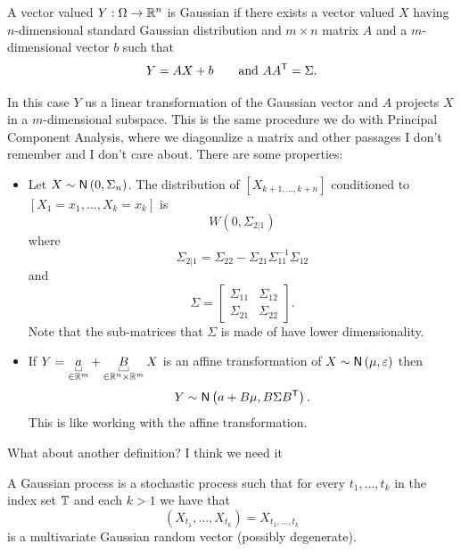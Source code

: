 \documentclass[12pt]{report}
\begin{document}
\begin{definition}
	A vector valued \rv{} $Y:\Omega\to\mathbb{R}^{n}$ is Gaussian if there exists a vector valued $X$ having $n$-dimensional standard Gaussian distribution and $m\times n$ matrix $A$ and a $m$-dimensional vector $b$ such that
	\begin{equation*}
		Y=AX+b\qquad\text{and }AA^{\mathsf{T}}=\Sigma.
	\end{equation*}
\end{definition}
In this case $Y$ us a linear transformation of the Gaussian vector and $A$ projects $X$ in a $m$-dimensional subspace. This is the same procedure we do with Principal Component Analysis, where we diagonalize a matrix and other passages I don't remember and I don't care about.
There are some properties:
\begin{proposition}
	\begin{itemize}
		\item Let $X\sim\mathsf{N}\left(0,\Sigma_{n}\right)$. The distribution of $\left[X_{k+1,\ldots,k+n}\right]$ conditioned to $\left[X_{1}=x_{1},\ldots,X_{k}=x_{k}\right]$ is \begin{equation*}
		W(0,\Sigma_{2|1})
		\end{equation*}
		where 
		\begin{equation*}
			\Sigma_{2|1}=\Sigma_{22}-\Sigma_{21}\Sigma_{11}^{-1}\Sigma_{12}
		\end{equation*}
		and 
		\begin{equation*}
			\Sigma=\begin{bmatrix}
				\Sigma_{11}&\Sigma_{12}\\
				\Sigma_{21}&\Sigma_{22}
			\end{bmatrix}.
		\end{equation*}
		Note that the sub-matrices that $\Sigma$ is made of have lower dimensionality.
		\item If $Y=\ubracketthin{a}_{\in\R^{m}}+\ubracketthin{B}_{\in\R^{n}\times\R^{m}}X$ is an affine transformation of $X\sim\mathsf{N}\left(\mu,\varepsilon\right)$ then $$Y\sim\mathsf{N}\left(a+B\mu, B\Sigma B^{\mathsf{T}}\right).$$
		This is like working with the affine transformation.
	\end{itemize}
\end{proposition}
What about another definition? I think we need it
\begin{definition}
	A Gaussian process is a stochastic process such that for every $t_{1},\ldots,t_{k}$ in the index set $\mathbb{T}$ and each $k>1$ we have that
	\begin{equation*}
		\left(X_{t_{1}},\ldots,X_{t_{k}}\right)=X_{t_{1},\ldots,t_{k}}
	\end{equation*}
	is a multivariate Gaussian random vector (possibly degenerate).
\end{definition}
\end{document}
